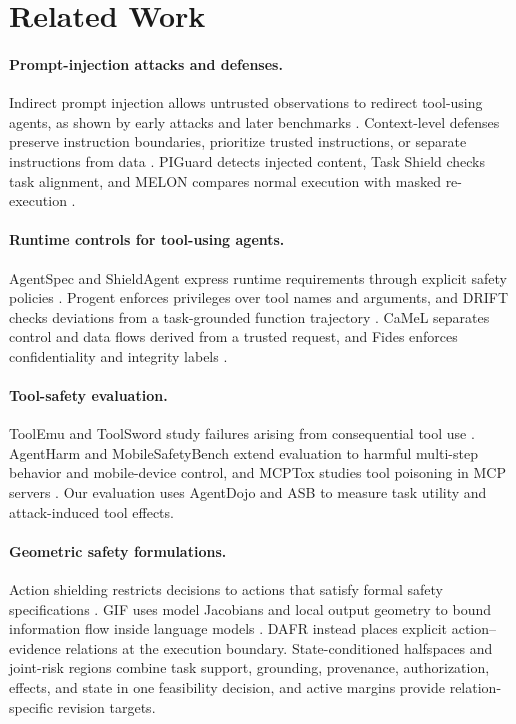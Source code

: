 \documentclass[letterpaper]{article}
\begin{document}
\section{Related Work}

\paragraph{Prompt-injection attacks and defenses.}
Indirect prompt injection allows untrusted observations to redirect tool-using agents, as shown by early attacks and later benchmarks \citep{greshake2023indirectpromptinjection,liu2023promptinjection,zhan2024injecagent,NEURIPS2024_97091a51}. Context-level defenses preserve instruction boundaries, prioritize trusted instructions, or separate instructions from data \citep{hines2024spotlighting,wallace2024instructionhierarchy,chen2025struq}. PIGuard detects injected content, Task Shield checks task alignment, and MELON compares normal execution with masked re-execution \citep{li2025piguard,jia2025taskshield,zhu2025melon}.

\paragraph{Runtime controls for tool-using agents.}
AgentSpec and ShieldAgent express runtime requirements through explicit safety policies \citep{wang2025agentspec,chen2025shieldagent}. Progent enforces privileges over tool names and arguments, and DRIFT checks deviations from a task-grounded function trajectory \citep{shi2025progent,NEURIPS2025_77f3b26c}. CaMeL separates control and data flows derived from a trusted request, and Fides enforces confidentiality and integrity labels \citep{debenedetti2025defeatingpromptinjectionsdesign,costa2025fides}.

\paragraph{Tool-safety evaluation.}
ToolEmu and ToolSword study failures arising from consequential tool use \citep{ruan2024toolemu,ye2024toolsword}. AgentHarm and MobileSafetyBench extend evaluation to harmful multi-step behavior and mobile-device control, and MCPTox studies tool poisoning in MCP servers \citep{andriushchenko2025agentharm,lee2026mobilesafetybench,wang2026mcptox}. Our evaluation uses AgentDojo and ASB to measure task utility and attack-induced tool effects.

\paragraph{Geometric safety formulations.}
Action shielding restricts decisions to actions that satisfy formal safety specifications \citep{alshiekh2018shielding}. GIF uses model Jacobians and local output geometry to bound information flow inside language models \citep{storek2026gif}. DAFR instead places explicit action--evidence relations at the execution boundary. State-conditioned halfspaces and joint-risk regions combine task support, grounding, provenance, authorization, effects, and state in one feasibility decision, and active margins provide relation-specific revision targets.
\end{document}
